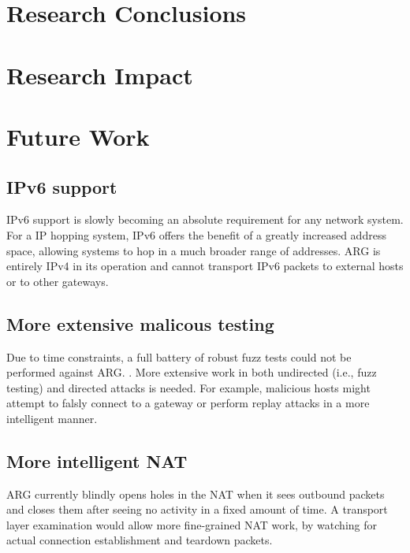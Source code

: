 \section{Research Conclusions}

\section{Research Impact}

\section{Future Work}
\subsection{IPv6 support}
\par \ac{IPv6} support is slowly becoming an absolute requirement for any network system. For a \ac{IP} hopping system, \ac{IPv6} offers the benefit of a greatly increased address space, allowing systems to hop in a much broader range of addresses. \ac{ARG} is entirely \ac{IPv4} in its operation and cannot transport \ac{IPv6} packets to external hosts or to other gateways.

\subsection{More extensive malicous testing}
\par Due to time constraints, a full battery of robust fuzz tests could not be performed against \ac{ARG}. . More extensive work in both undirected (i.e., fuzz testing) and directed attacks is needed. For example, malicious hosts might attempt to falsly connect to a gateway or perform replay attacks in a more intelligent manner. 

\subsection{More intelligent NAT}
\par \ac{ARG} currently blindly opens holes in the \ac{NAT} when it sees outbound packets and closes them after seeing no activity in a fixed amount of time. A transport layer examination would allow more fine-grained \ac{NAT} work, by watching for actual connection establishment and teardown packets. 

